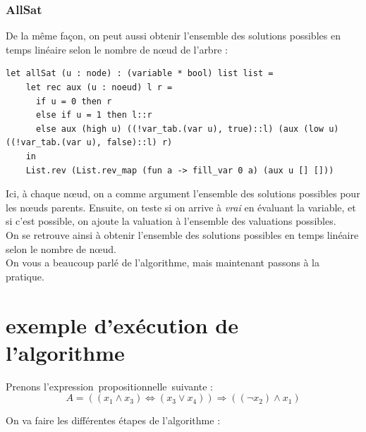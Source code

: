 \documentclass[a4paper, oneside]{report}
\newcommand{\expp}{expression~propositionnelle~}
\begin{document}
\subsubsection{AllSat}

De la même façon, on peut aussi obtenir l'ensemble des solutions possibles en temps linéaire selon le nombre de nœud de l'arbre :
\begin{lstlisting}
let allSat (u : node) : (variable * bool) list list =
    let rec aux (u : noeud) l r =
      if u = 0 then r
      else if u = 1 then l::r
      else aux (high u) ((!var_tab.(var u), true)::l) (aux (low u) ((!var_tab.(var u), false)::l) r)
    in 
    List.rev (List.rev_map (fun a -> fill_var 0 a) (aux u [] []))
\end{lstlisting}
Ici, à chaque nœud, on a comme argument l'ensemble des solutions possibles pour les nœuds parents. Ensuite, on teste si on arrive à \textit{vrai} en évaluant la variable, et si c'est possible, on ajoute la valuation à l'ensemble des valuations possibles.\\
On se retrouve ainsi à obtenir l'ensemble des solutions possibles en temps linéaire selon le nombre de nœud.\\

On vous a beaucoup parlé de l'algorithme, mais maintenant passons à la pratique.

\section{exemple d'exécution de l'algorithme}

Prenons l'\expp suivante :
$$A = ((x_1 \wedge x_3) \Leftrightarrow (x_3 \vee x_4)) \Rightarrow ((\neg x_2) \wedge x_1)$$

On va faire les différentes étapes de l'algorithme :
\newcommand{\largeur}{0.5\linewidth}
\end{document}
